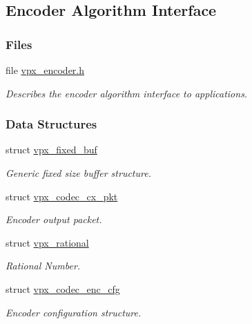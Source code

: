 \hypertarget{group__encoder}{\subsection{Encoder Algorithm Interface}
\label{group__encoder}
}
\subsubsection*{Files}
\begin{DoxyCompactItemize}
\item 
file \hyperlink{vpx__encoder_8h}{vpx\+\_\+encoder.\+h}
\begin{DoxyCompactList}\small\item\em Describes the encoder algorithm interface to applications. \end{DoxyCompactList}\end{DoxyCompactItemize}
\subsubsection*{Data Structures}
\begin{DoxyCompactItemize}
\item 
struct \hyperlink{structvpx__fixed__buf}{vpx\+\_\+fixed\+\_\+buf}
\begin{DoxyCompactList}\small\item\em Generic fixed size buffer structure. \end{DoxyCompactList}\item 
struct \hyperlink{structvpx__codec__cx__pkt}{vpx\+\_\+codec\+\_\+cx\+\_\+pkt}
\begin{DoxyCompactList}\small\item\em Encoder output packet. \end{DoxyCompactList}\item 
struct \hyperlink{structvpx__rational}{vpx\+\_\+rational}
\begin{DoxyCompactList}\small\item\em Rational Number. \end{DoxyCompactList}\item 
struct \hyperlink{structvpx__codec__enc__cfg}{vpx\+\_\+codec\+\_\+enc\+\_\+cfg}
\begin{DoxyCompactList}\small\item\em Encoder configuration structure. \end{DoxyCompactList}\end{DoxyCompactItemize}
